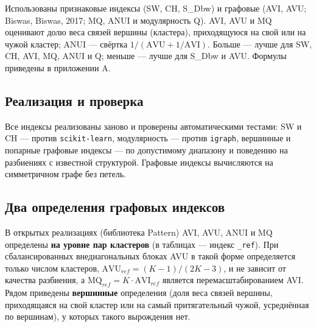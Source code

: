 \documentclass[11pt,a4paper]{article}
\begin{document}
Использованы признаковые индексы (SW, CH, S\_Dbw) и графовые (AVI, AVU; Biswas, Biswas, 2017; MQ, ANUI и модулярность Q). AVI, AVU и MQ оценивают долю веса связей вершины (кластера), приходящуюся на свой или на чужой кластер; ANUI --- свёртка \(1/(\mathrm{AVU} + 1/\mathrm{AVI})\). Больше --- лучше для SW, CH, AVI, MQ, ANUI и Q; меньше --- лучше для S\_Dbw и AVU. Формулы приведены в приложении A.

\subsection{Реализация и проверка}\label{ux440ux435ux430ux43bux438ux437ux430ux446ux438ux44f-ux438-ux43fux440ux43eux432ux435ux440ux43aux430}

Все индексы реализованы заново и проверены автоматическими тестами: SW и CH --- против \texttt{scikit-\allowbreak{}learn}, модулярность --- против \texttt{igraph}, вершинные и попарные графовые индексы --- по допустимому диапазону и поведению на разбиениях с известной структурой. Графовые индексы вычисляются на симметричном графе без петель.

\subsection{Два определения графовых индексов}\label{ux434ux432ux430-ux43eux43fux440ux435ux434ux435ux43bux435ux43dux438ux44f-ux433ux440ux430ux444ux43eux432ux44bux445-ux438ux43dux434ux435ux43aux441ux43eux432}

В открытых реализациях (библиотека Pattern) AVI, AVU, ANUI и MQ определены \textbf{на уровне пар кластеров} (в таблицах --- индекс \texttt{\_\allowbreak{}ref}). При сбалансированных внедиагональных блоках AVU в такой форме определяется только числом кластеров, \(\mathrm{AVU}_{ref} = (K-1)/(2K-3)\), и не зависит от качества разбиения, а \(\mathrm{MQ}_{ref} = K \cdot \mathrm{AVI}_{ref}\) является перемасштабированием AVI. Рядом приведены \textbf{вершинные} определения (доля веса связей вершины, приходящаяся на свой кластер или на самый притягательный чужой, усреднённая по вершинам), у которых такого вырождения нет.

\begingroup\footnotesize\setlength{\tabcolsep}{4pt}
\end{document}
